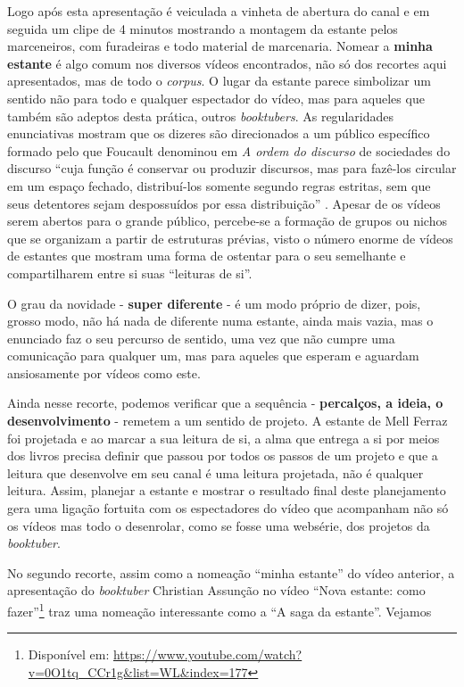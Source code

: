 Logo após esta apresentação é veiculada a vinheta de abertura do canal e
em seguida um clipe de 4 minutos mostrando a montagem da estante pelos
marceneiros, com furadeiras e todo material de marcenaria. Nomear a
\textbf{minha estante} é algo comum nos diversos vídeos
encontrados, não só dos recortes aqui apresentados, mas de todo o
\textit{corpus}. O lugar da estante parece simbolizar um sentido não para
todo e qualquer espectador do vídeo, mas para aqueles que também são
adeptos desta prática, outros \textit{booktubers}. As regularidades
enunciativas mostram que os dizeres são direcionados a um público
específico formado pelo que Foucault denominou em \textit{A ordem do
discurso} de sociedades do discurso \enquote{cuja função é conservar ou
produzir discursos, mas para fazê-los circular em um espaço fechado,
distribuí-los somente segundo regras estritas, sem que seus detentores
sejam despossuídos por essa distribuição} \cite[p]{foucault2010ordem}.
Apesar de os vídeos serem abertos para o grande público, percebe-se a
formação de grupos ou nichos que se organizam a partir de estruturas
prévias, visto o número enorme de vídeos de estantes que mostram uma
forma de ostentar para o seu semelhante e compartilharem entre si suas
\enquote{leituras de si}.

O grau da novidade - \textbf{super diferente} - é um modo
próprio de dizer, pois, grosso modo, não há nada de diferente numa
estante, ainda mais vazia, mas o enunciado faz o seu percurso de
sentido, uma vez que não cumpre uma comunicação para qualquer um, mas
para aqueles que esperam e aguardam ansiosamente por vídeos como este.

Ainda nesse recorte, podemos verificar que a sequência -
\textbf{percalços, a ideia, o desenvolvimento} - remetem a um
sentido de projeto. A estante de Mell Ferraz foi projetada e ao marcar a
sua leitura de si, a alma que entrega a si por meios dos livros precisa
definir que passou por todos os passos de um projeto e que a leitura que
desenvolve em seu canal é uma leitura projetada, não é qualquer leitura.
Assim, planejar a estante e mostrar o resultado final deste planejamento
gera uma ligação fortuita com os espectadores do vídeo que acompanham
não só os vídeos mas todo o desenrolar, como se fosse uma websérie, dos
projetos da \textit{booktuber}.

No segundo recorte, assim como a nomeação \enquote{minha estante} do vídeo
anterior, a apresentação do \textit{booktuber} Christian Assunção no vídeo
\enquote{Nova estante: como fazer}\footnote{Disponível em:
  \url{https://www.youtube.com/watch?v=0O1tq\_CCr1g\&list=WL\&index=177}} traz
uma nomeação interessante como a \enquote{A saga da estante}. Vejamos

